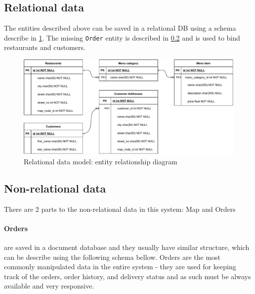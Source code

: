\documentclass[11pt,a4paper]{article}
\begin{document}
	\newpage
	\subsection{Relational data}
		The entities described above can be saved in a relational DB using a schema describe in \ref{fig:er}. The missing \texttt{Order} entity is described in \ref{sec:nonrelational-data} and is used to bind restaurants and customers.
		
		\begin{figure}[h]
			\centering
			\includegraphics[width=0.9\linewidth]{img/er.drawio.pdf}
			\caption{Relational data model: entity relationship diagram}
			\label{fig:er}
		\end{figure}
	
	\subsection{Non-relational data}\label{sec:nonrelational-data}
		There are 2 parts to the non-relational data in this system: Map and Orders
		\paragraph{Orders} are saved in a document database and they usually have similar structure, which can be describe using the following schema bellow. Orders are the most commonly manipulated data in the entire system - they are used  for keeping track of the orders, order history, and delivery status and as such must be always available and very responsive. 
		
\end{document}
